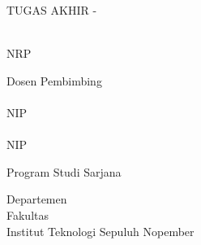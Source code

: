 \begin{large}
  TUGAS AKHIR - \coursecode{}
\end{large}

\vspace{\fill}

\begin{spacing}{1.5}
  \begin{Large}
    \tatitle{}
  \end{Large}
\end{spacing}

\vspace{\fill}

\begin{large}
  \name{} \\
  \textmd{NRP \nrp{}}
\end{large}

\vspace{\fill}

\begin{large}
  \textmd{Dosen Pembimbing} \\
  \advisor{} \\
  \textmd{NIP \advisornip{}} \\
  \coadvisor{} \\
  \textmd{NIP \coadvisornip{}} \\
\end{large}

\vspace{\fill}

Program Studi Sarjana \studyprogram{} \\

\mdseries

Departemen \department{} \\
Fakultas \faculty{} \\
Institut Teknologi Sepuluh Nopember

\place{} \\
\the\year{}
